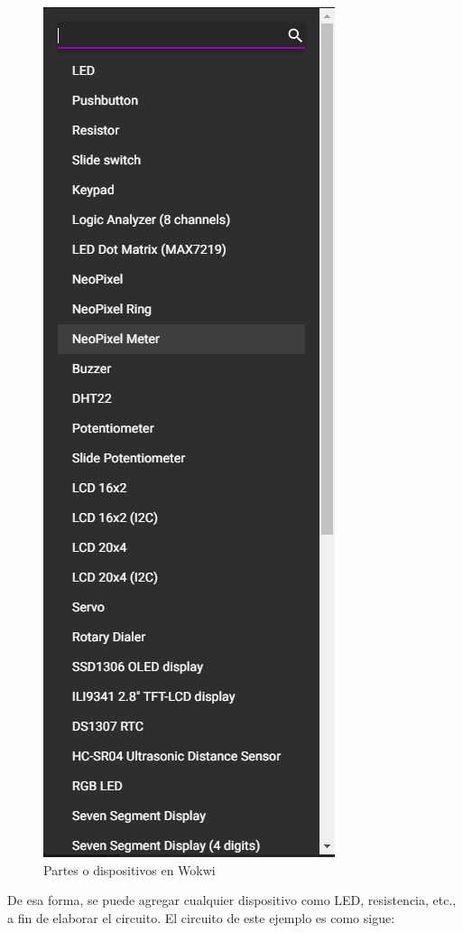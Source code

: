 \documentclass{article}
\begin{document}
    \begin{figure}[H]
        \centering
        \includegraphics[width=0.2\paperwidth]{images/wokwi-parts}
        \caption{Partes o dispositivos en Wokwi}
    \end{figure}

    De esa forma, se puede agregar cualquier dispositivo como LED, resistencia, etc., a fin de elaborar el circuito. El circuito de este ejemplo es como sigue:
\end{document}
